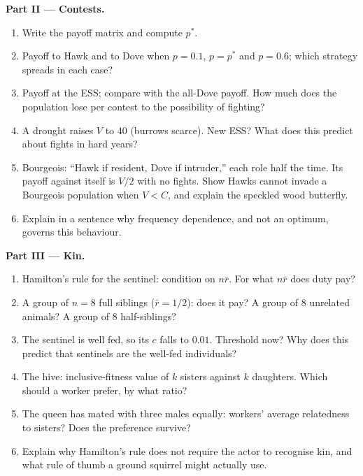 \begin{problem}
\medskip
\noindent\textbf{Part II --- Contests.}
\begin{enumerate}[resume]
  \item Write the payoff matrix and compute $p^{*}$.
  \item Payoff to Hawk and to Dove when $p = 0.1$, $p = p^{*}$ and $p =
        0.6$; which strategy spreads in each case?
  \item Payoff at the ESS; compare with the all-Dove payoff. How much
        does the population lose per contest to the possibility of
        fighting?
  \item A drought raises $V$ to $40$ (burrows scarce). New ESS? What
        does this predict about fights in hard years?
  \item Bourgeois: ``Hawk if resident, Dove if intruder,'' each role
        half the time. Its payoff against itself is $V/2$ with no
        fights. Show Hawks cannot invade a Bourgeois population when $V
        < C$, and explain the speckled wood butterfly.
  \item Explain in a sentence why frequency dependence, and not an
        optimum, governs this behaviour.
\end{enumerate}

\medskip
\noindent\textbf{Part III --- Kin.}
\begin{enumerate}[resume]
  \item Hamilton's rule for the sentinel: condition on $n\bar r$. For
        what $n\bar r$ does duty pay?
  \item A group of $n = 8$ full siblings ($\bar r = 1/2$): does it pay?
        A group of 8 unrelated animals? A group of 8 half-siblings?
  \item The sentinel is well fed, so its $c$ falls to $0.01$. Threshold
        now? Why does this predict that sentinels are the well-fed
        individuals?
  \item The hive: inclusive-fitness value of $k$ sisters against $k$
        daughters. Which should a worker prefer, by what ratio?
  \item The queen has mated with three males equally: workers' average
        relatedness to sisters? Does the preference survive?
  \item Explain why Hamilton's rule does not require the actor to
        recognise kin, and what rule of thumb a ground squirrel might
        actually use.
\end{enumerate}


\end{problem}
